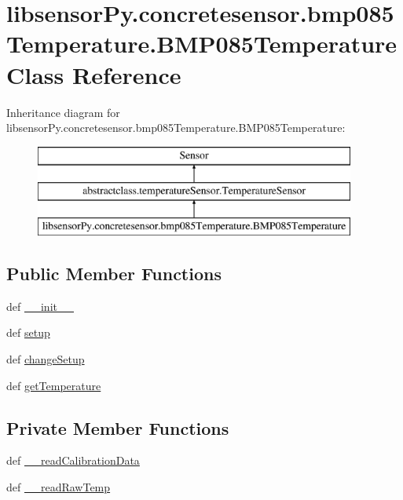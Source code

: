 \hypertarget{classlibsensorPy_1_1concretesensor_1_1bmp085Temperature_1_1BMP085Temperature}{}\section{libsensor\+Py.\+concretesensor.\+bmp085\+Temperature.\+B\+M\+P085\+Temperature Class Reference}
\label{classlibsensorPy_1_1concretesensor_1_1bmp085Temperature_1_1BMP085Temperature}
Inheritance diagram for libsensor\+Py.\+concretesensor.\+bmp085\+Temperature.\+B\+M\+P085\+Temperature\+:\begin{figure}[H]
\begin{center}
\leavevmode
\includegraphics[height=3.000000cm]{classlibsensorPy_1_1concretesensor_1_1bmp085Temperature_1_1BMP085Temperature}
\end{center}
\end{figure}
\subsection*{Public Member Functions}
\begin{DoxyCompactItemize}
\item 
def \hyperlink{classlibsensorPy_1_1concretesensor_1_1bmp085Temperature_1_1BMP085Temperature_ae0fea7c9ad3e4e8b0e170b8c095f5ed8}{\+\_\+\+\_\+init\+\_\+\+\_\+}
\item 
def \hyperlink{classlibsensorPy_1_1concretesensor_1_1bmp085Temperature_1_1BMP085Temperature_ab89cbd064610439e202bfa994ee2f337}{setup}
\item 
def \hyperlink{classlibsensorPy_1_1concretesensor_1_1bmp085Temperature_1_1BMP085Temperature_a315b2d0a9caf54cb6830d72be9006d41}{change\+Setup}
\item 
def \hyperlink{classlibsensorPy_1_1concretesensor_1_1bmp085Temperature_1_1BMP085Temperature_a0e5d76dfc1e60f9d59f61f4493c362f1}{get\+Temperature}
\end{DoxyCompactItemize}
\subsection*{Private Member Functions}
\begin{DoxyCompactItemize}
\item 
def \hyperlink{classlibsensorPy_1_1concretesensor_1_1bmp085Temperature_1_1BMP085Temperature_aed776f906d0d1eeb80e70d4cb083f16c}{\+\_\+\+\_\+read\+Calibration\+Data}
\item 
def \hyperlink{classlibsensorPy_1_1concretesensor_1_1bmp085Temperature_1_1BMP085Temperature_a79100350dc70513b067b6c4e7a1b1e10}{\+\_\+\+\_\+read\+Raw\+Temp}
\end{DoxyCompactItemize}
